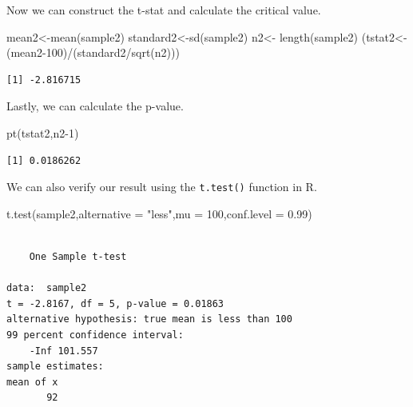 \documentclass[
  letterpaper,
  DIV=11,
  numbers=noendperiod]{scrreprt}
\newenvironment{Shaded}{\begin{snugshade}}{\end{snugshade}}
\newcommand{\AttributeTok}[1]{\textcolor[rgb]{0.40,0.45,0.13}{#1}}
\newcommand{\DecValTok}[1]{\textcolor[rgb]{0.68,0.00,0.00}{#1}}
\newcommand{\FloatTok}[1]{\textcolor[rgb]{0.68,0.00,0.00}{#1}}
\newcommand{\FunctionTok}[1]{\textcolor[rgb]{0.28,0.35,0.67}{#1}}
\newcommand{\NormalTok}[1]{\textcolor[rgb]{0.00,0.23,0.31}{#1}}
\newcommand{\OtherTok}[1]{\textcolor[rgb]{0.00,0.23,0.31}{#1}}
\newcommand{\SpecialCharTok}[1]{\textcolor[rgb]{0.37,0.37,0.37}{#1}}
\newcommand{\StringTok}[1]{\textcolor[rgb]{0.13,0.47,0.30}{#1}}
\begin{document}
Now we can construct the t-stat and calculate the critical value.

\begin{Shaded}
\begin{Highlighting}[numbers=left,,]
\NormalTok{mean2}\OtherTok{\textless{}{-}}\FunctionTok{mean}\NormalTok{(sample2)}
\NormalTok{standard2}\OtherTok{\textless{}{-}}\FunctionTok{sd}\NormalTok{(sample2)}
\NormalTok{n2}\OtherTok{\textless{}{-}} \FunctionTok{length}\NormalTok{(sample2)}
\NormalTok{(tstat2}\OtherTok{\textless{}{-}}\NormalTok{(mean2}\DecValTok{{-}100}\NormalTok{)}\SpecialCharTok{/}\NormalTok{(standard2}\SpecialCharTok{/}\FunctionTok{sqrt}\NormalTok{(n2)))}
\end{Highlighting}
\end{Shaded}

\begin{verbatim}
[1] -2.816715
\end{verbatim}

Lastly, we can calculate the p-value.

\begin{Shaded}
\begin{Highlighting}[numbers=left,,]
\FunctionTok{pt}\NormalTok{(tstat2,n2}\DecValTok{{-}1}\NormalTok{)}
\end{Highlighting}
\end{Shaded}

\begin{verbatim}
[1] 0.0186262
\end{verbatim}

We can also verify our result using the \texttt{t.test()} function in R.

\begin{Shaded}
\begin{Highlighting}[numbers=left,,]
\FunctionTok{t.test}\NormalTok{(sample2,}\AttributeTok{alternative =} \StringTok{"less"}\NormalTok{,}\AttributeTok{mu =} \DecValTok{100}\NormalTok{,}\AttributeTok{conf.level =} \FloatTok{0.99}\NormalTok{)}
\end{Highlighting}
\end{Shaded}

\begin{verbatim}

    One Sample t-test

data:  sample2
t = -2.8167, df = 5, p-value = 0.01863
alternative hypothesis: true mean is less than 100
99 percent confidence interval:
    -Inf 101.557
sample estimates:
mean of x 
       92 
\end{verbatim}
\end{document}
